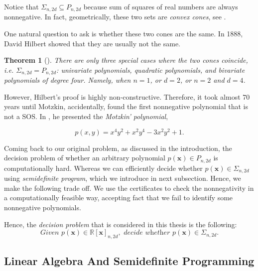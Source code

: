 \documentclass[12pt]{amsart}
\numberwithin{equation}{section}
\newtheorem{thm}{Theorem}
\theoremstyle{definition}
\numberwithin{thm}{section}
\begin{document}
Notice that $\Sigma_{n,2d} \subseteq P_{n, 2d}$ because sum of squares of real numbers are always nonnegative. 
In fact, geometrically, these two sets are \emph{convex cones}, see \cite[Chapter~3]{Blekherman:Parrilo:Thomas}.

One natural question to ask is whether these two cones are the same. In 1888, David Hilbert showed that they are usually not the same.

\begin{thm} [\cite{hilbert_david_1888_1428214}]
     There are only three special cases where the two cones coincide, i.e. $\Sigma_{n,2d} = P_{n, 2d}$: 
     univariate polynomials, quadratic polynomials, and bivariate polynomials of degree four. Namely, when $n = 1$, or $d = 2$, or $n = 2$ and $d = 4$.
\end{thm}

However, Hilbert's proof is highly non-constructive. 
Therefore, it took almost 70 years until Motzkin, accidentally,
found the first nonnegative polynomial that is not a SOS. 
In \cite{motzkin1967arithmetic}, he presented the \emph{Motzkin' polynomial},

\begin{equation*}
     p(x, y) = x^4y^2 + x^2y^4 - 3 x^2y^2 + 1.
\end{equation*}

Coming back to our original problem, as discussed in the introduction, the decision problem of whether an arbitrary polynomial $p(\mathbf{x}) \in P_{n, 2d}$ is computationally hard.
Whereas we can efficiently decide whether $p(\mathbf{x}) \in \Sigma_{n, 2d}$ using \emph{semidefinite program}, which we introduce in next subsection. 
Hence, we make the following trade off.
We use the certificates to check the nonnegativity in a computationally feasible way,
accepting fact that we fail to identify some nonnegative polynomials.

Hence, the \emph{decision problem} that is considered in this thesis is the following: 
\begin{equation}
     \textit{Given } p(\mathbf{x}) \in \mathbb{R}[\mathbf{x}]_{n, 2d}, \textit{ decide whether } p(\mathbf{x}) \in \Sigma_{n, 2d} \label{eq:dp}.
\end{equation}

\subsection{Linear Algebra And Semidefinite Programming}
\label{Sec:Linear Algebra}
\end{document}
